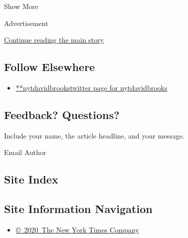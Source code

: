 Show More

Advertisement

\protect\hyperlink{after-mid2}{Continue reading the main story}

\hypertarget{follow-elsewhere}{%
\subsection{Follow Elsewhere}\label{follow-elsewhere}}

\begin{itemize}
\tightlist
\item
  \href{https://twitter.com/nytdavidbrooks}{**nytdavidbrookstwitter page
  for nytdavidbrooks}
\end{itemize}

\hypertarget{feedback-questions}{%
\subsection{Feedback? Questions?}\label{feedback-questions}}

Include your name, the article headline, and your message.

Email Author

\hypertarget{site-index}{%
\subsection{Site Index}\label{site-index}}

\hypertarget{site-information-navigation}{%
\subsection{Site Information
Navigation}\label{site-information-navigation}}

\begin{itemize}
\tightlist
\item
  \href{https://help.nytimes.com/hc/en-us/articles/115014792127-Copyright-notice}{©~2020~The
  New York Times Company}
\end{itemize}

